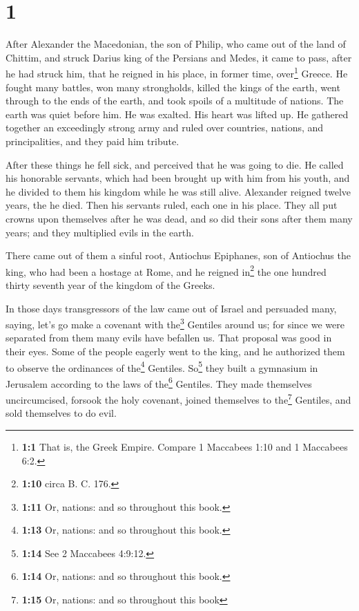 \hypertarget{section}{%
\section{1}\label{section}}

 After Alexander the Macedonian, the son of Philip, who
came out of the land of Chittim, and struck Darius king of the Persians
and Medes, it came to pass, after he had struck him, that he reigned in
his place, in former time, over\footnote{\textbf{1:1} That is, the Greek
  Empire. Compare 1 Maccabees 1:10 and 1 Maccabees 6:2.} Greece.
 He fought many battles, won many strongholds, killed the
kings of the earth,  went through to the ends of the
earth, and took spoils of a multitude of nations. The earth was quiet
before him. He was exalted. His heart was lifted up.  He
gathered together an exceedingly strong army and ruled over countries,
nations, and principalities, and they paid him tribute.

 After these things he fell sick, and perceived that he
was going to die.  He called his honorable servants, which
had been brought up with him from his youth, and he divided to them his
kingdom while he was still alive.  Alexander reigned
twelve years, the he died.  Then his servants ruled, each
one in his place.  They all put crowns upon themselves
after he was dead, and so did their sons after them many years; and they
multiplied evils in the earth.

 There came out of them a sinful root, Antiochus
Epiphanes, son of Antiochus the king, who had been a hostage at Rome,
and he reigned in\footnote{\textbf{1:10} circa B. C. 176.} the one
hundred thirty seventh year of the kingdom of the Greeks.

 In those days transgressors of the law came out of
Israel and persuaded many, saying, let's go make a covenant with
the\footnote{\textbf{1:11} Or, nations: and so throughout this book.}
Gentiles around us; for since we were separated from them many evils
have befallen us.  That proposal was good in their eyes.
 Some of the people eagerly went to the king, and he
authorized them to observe the ordinances of the\footnote{\textbf{1:13}
  Or, nations: and so throughout this book.} Gentiles. 
So\footnote{\textbf{1:14} See 2 Maccabees 4:9:12.} they built a
gymnasium in Jerusalem according to the laws of the\footnote{\textbf{1:14}
  Or, nations: and so throughout this book.} Gentiles. 
They made themselves uncircumcised, forsook the holy covenant, joined
themselves to the\footnote{\textbf{1:15} Or, nations: and so throughout
  this book} Gentiles, and sold themselves to do evil.

